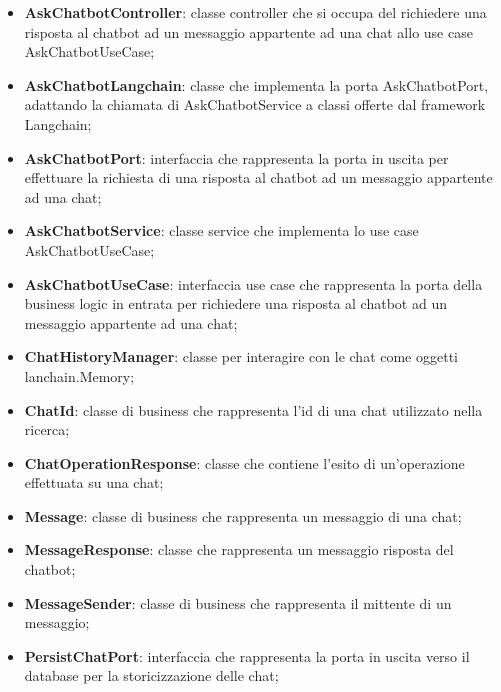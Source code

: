 \documentclass[10pt, a4paper]{article}
\begin{document}
    





\begin{itemize}
    \item \label{AskChatbotController}\textbf{AskChatbotController}: classe controller che si occupa del richiedere una risposta al chatbot ad un messaggio appartente ad una chat allo use case AskChatbotUseCase;
    \item \label{AskChatbotLangchain}\textbf{AskChatbotLangchain}: classe che implementa la porta AskChatbotPort, adattando la chiamata di AskChatbotService a classi offerte dal framework Langchain;
    \item \label{AskChatbotPort}\textbf{AskChatbotPort}: interfaccia che rappresenta la porta in uscita per effettuare la richiesta di una risposta al chatbot ad un messaggio appartente ad una chat;%
    \item \label{AskChatbotService}\textbf{AskChatbotService}: classe service che implementa lo use case AskChatbotUseCase;
    \item \label{AskChatbotUseCase}\textbf{AskChatbotUseCase}: interfaccia use case che rappresenta la porta della business logic in entrata per richiedere una risposta al chatbot ad un messaggio appartente ad una chat;
    \item \label{ChatHistoryManager}\textbf{ChatHistoryManager}: classe per interagire con le chat come oggetti lanchain.Memory;
    \item \label{ChatId}\textbf{ChatId}: classe di business che rappresenta l'id di una chat utilizzato nella ricerca;
    \item \label{ChatOperationResponse}\textbf{ChatOperationResponse}: classe che contiene l'esito di un'operazione effettuata su una chat;
    \item \label{Message}\textbf{Message}: classe di business che rappresenta un messaggio di una chat;
    \item \label{MessageResponse}\textbf{MessageResponse}: classe che rappresenta un messaggio risposta del chatbot;
    \item \label{MessageSender}\textbf{MessageSender}: classe di business che rappresenta il mittente di un messaggio;
    \item \label{PersistChatPort}\textbf{PersistChatPort}: interfaccia che rappresenta la porta in uscita verso il database per la storicizzazione delle chat;

\end{itemize}
\end{document}
